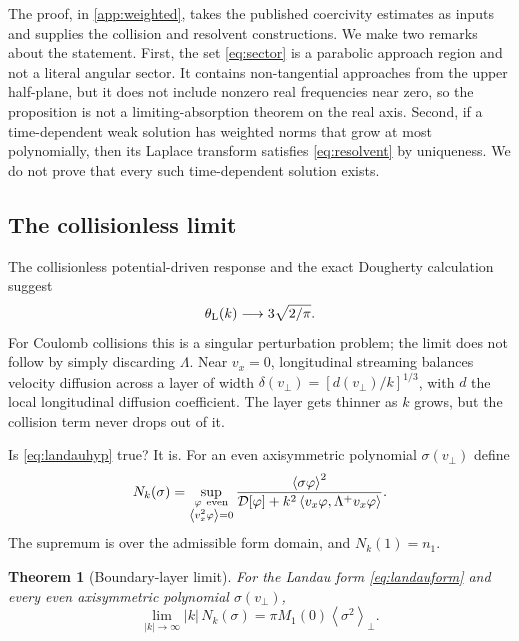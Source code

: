 \documentclass[11pt]{article}
\newcommand{\av}[1]{\left\langle #1\right\rangle}
\newcommand{\D}{\mathcal D}
\newcommand{\dual}[1]{\left\langle #1,\Lambda^+ #1\right\rangle}
\newtheorem{theorem}{Theorem}[section]
\theoremstyle{definition}
\theoremstyle{remark}
\numberwithin{equation}{section}
\begin{document}
The proof, in \cref{app:weighted}, takes the published coercivity
estimates as inputs and supplies the collision and resolvent
constructions. We make two remarks about the statement. First, the set
\eqref{eq:sector} is a parabolic approach region and not a literal
angular sector. It contains non-tangential approaches from the upper
half-plane, but it does not include nonzero real frequencies near zero,
so the proposition is not a limiting-absorption theorem on the real axis.
Second, if a time-dependent weak solution has weighted norms that grow at
most polynomially, then its Laplace transform satisfies
\eqref{eq:resolvent} by uniqueness. We do not prove that every such
time-dependent solution exists.

\subsection{The collisionless limit}\label{sec:airy}

The collisionless potential-driven response and the exact Dougherty calculation
suggest
\begin{equation}
 \theta_{\rm L}(k)\longrightarrow3\sqrt{2/\pi}.
 \label{eq:landauhyp}
\end{equation}
For Coulomb collisions this is a singular perturbation problem; the limit
does not follow by simply discarding $\Lambda$. Near $v_x=0$, longitudinal
streaming
balances velocity diffusion across a layer of width
$\delta(v_\perp)=[d(v_\perp)/k]^{1/3}$, with $d$ the local
longitudinal diffusion coefficient. The layer gets thinner as $k$ grows,
but the collision term never drops out of it.

Is \eqref{eq:landauhyp} true? It is. For an even axisymmetric polynomial
$\sigma(v_\perp)$ define
\[
 N_k(\sigma)=\sup_{\substack{\varphi\ {\rm even}\\
                            \av{v_x^2\varphi}=0}}
 \frac{\av{\sigma\varphi}^2}
      {\D[\varphi]+k^2\dual{v_x\varphi}}.
\]
The supremum is over the admissible form domain, and $N_k(1)=n_1$.

\begin{theorem}[Boundary-layer limit]\label{thm:airy}
For the Landau form \eqref{eq:landauform} and every even axisymmetric
polynomial $\sigma(v_\perp)$,
\begin{equation}
 \lim_{|k|\to\infty}|k|\,N_k(\sigma)
       =\pi M_1(0)\av{\sigma^2}_\perp .
 \label{eq:BLhyp}
\end{equation}
\end{theorem}
\end{document}
